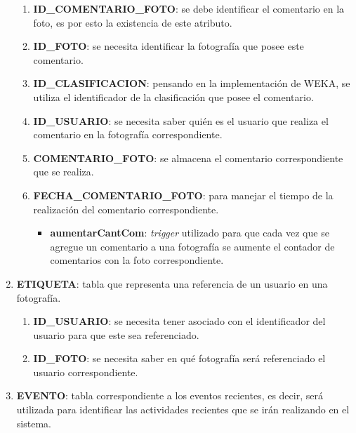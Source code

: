 \documentclass{memoria}
\begin{document}
\begin{enumerate}
	\begin{enumerate}
	\item \textbf{ID\_COMENTARIO\_FOTO}: se debe identificar el comentario en la foto, es por esto la existencia de este atributo.
	\item \textbf{ID\_FOTO}: se necesita identificar la fotografía que posee este comentario.
	\item \textbf{ID\_CLASIFICACION}: pensando en la implementación de WEKA, se utiliza el identificador de la clasificación que posee el comentario.
	\item \textbf{ID\_USUARIO}: se necesita saber quién es el usuario que realiza el comentario en la fotografía correspondiente.
	\item \textbf{COMENTARIO\_FOTO}: se almacena el comentario correspondiente que se realiza.
	\item \textbf{FECHA\_COMENTARIO\_FOTO}: para manejar el tiempo de la realización del comentario correspondiente.
	
		\begin{itemize}
		\item \textbf{aumentarCantCom}: \textsl{trigger} utilizado para que cada vez que se agregue un comentario a una fotografía se aumente el contador de comentarios con la foto correspondiente.
		\end{itemize}
	\end{enumerate}
	
\item \textbf{ETIQUETA}: tabla que representa una referencia de un usuario en una fotografía.

	\begin{enumerate}
	\item \textbf{ID\_USUARIO}: se necesita tener asociado con el identificador del usuario para que este sea referenciado.
	\item \textbf{ID\_FOTO}: se necesita saber en qué fotografía será referenciado el usuario correspondiente.
	\end{enumerate}
	
\item \textbf{EVENTO}: tabla correspondiente a los eventos recientes, es decir, será utilizada para identificar las actividades recientes que se irán realizando en el sistema.


\end{enumerate}
\end{document}
